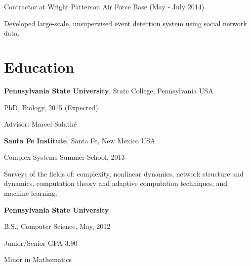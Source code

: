 \documentclass[margin,line]{res}
\newcommand{\linkToUrl}[1]{{\color{blue}\underline{\href{#1}{Link}}}}
\newenvironment{list1}{
  \begin{list}{\ding{113}}{%
      \setlength{\itemsep}{0in}
      \setlength{\parsep}{0in} \setlength{\parskip}{0in}
      \setlength{\topsep}{0in} \setlength{\partopsep}{0in} 
      \setlength{\leftmargin}{0.17in}}}{\end{list}}
\begin{document}
\begin{resume}
Contractor at Wright Patterson Air Force Base (May - July 2014)
\begin{list1}
\item[] Developed large-scale, unsupervised event detection system using social network data.
\end{list1}





\section{\sc Education}
{\bf Pennsylvania State University}, State College, Pennsylvania USA\\
\vspace*{-.1in}
\begin{list1}
\item[] PhD, Biology, 2015 (Expected)
\item[] Advisor: Marcel Salath\'e
\end{list1}

{\bf Santa Fe Institute}, Santa Fe, New Mexico USA\\
\vspace*{-.1in}
\begin{list1}
\item[] Complex Systems Summer School, 2013
\item[] Surveys of the fields of: complexity, nonlinear dynamics, network structure and dynamics, computation theory and adaptive computation techniques, and machine learning.
\end{list1}


{\bf Pennsylvania State University} \\
\vspace*{-.1in}
\begin{list1}
\item[] B.S., Computer Science,  May, 2012 
\item[] Junior/Senior GPA 3.90
\item[] Minor in Mathematics
\end{list1}



\end{resume}
\end{document}
